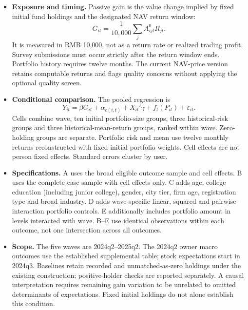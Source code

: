 \begin{itemize}
\item \textbf{Exposure and timing.} Passive gain is the value change implied by fixed initial fund holdings and the designated NAV return window:
\[
G_{it}=\frac{1}{10{,}000}\sum_j A_{ijt}^{0}R_{jt}.
\]
It is measured in RMB 10,000, not as a return rate or realized trading profit. Survey submissions must occur strictly after the return window ends. Portfolio history requires twelve months. The current NAV-price version retains computable returns and flags quality concerns without applying the optional quality screen.

\item \textbf{Conditional comparison.} The pooled regression is
\[
Y_{it}=\beta G_{it}+\alpha_{c(i,t)}+X_{it}'\gamma+f_t(P_{it})+\varepsilon_{it}.
\]
Cells combine wave, ten initial portfolio-size groups, three historical-risk groups and three historical-mean-return groups, ranked within wave. Zero-holding groups are separate. Portfolio risk and mean use twelve monthly returns reconstructed with fixed initial portfolio weights. Cell effects are not person fixed effects. Standard errors cluster by user.

\item \textbf{Specifications.} A uses the broad eligible outcome sample and cell effects. B uses the complete-case sample with cell effects only. C adds age, college education (including junior college), gender, city tier, firm age, registration type and broad industry. D adds wave-specific linear, squared and pairwise-interaction portfolio controls. E additionally includes portfolio amount in levels interacted with wave. B--E use identical observations within each outcome, not one intersection across all outcomes.

\item \textbf{Scope.} The five waves are 2024q2--2025q2. The 2024q2 owner macro outcomes use the established supplemental table; stock expectations start in 2024q3. Baselines retain recorded and unmatched-as-zero holdings under the existing construction; positive-holder checks are reported separately. A causal interpretation requires remaining gain variation to be unrelated to omitted determinants of expectations. Fixed initial holdings do not alone establish this condition.
\end{itemize}

